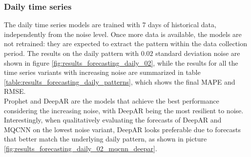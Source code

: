 \documentclass[a4paper, 12pt]{article} %
\begin{document}
	\subsubsection{Daily time series} \label{sssec:results_forecasting_daily}
	The daily time series models are trained with 7 days of historical data, independently from the noise level. Once more data is available, the models are not retrained: they are expected to extract the pattern within the data collection period.  The results on the daily pattern with $0.02$ standard deviation noise are shown in figure \ref{fig:results_forecasting_daily_02}, while the results for all the time series variants with increasing noise are summarized in table \ref{table:results_forecasting_daily_patterns}, which shows the final MAPE and RMSE.\\ 
	Prophet and DeepAR are the models that achieve the best performance considering the increasing noise, with DeepAR being the most resilient to noise. Interestingly, when qualitatively evaluating the forecasts of DeepAR and MQCNN on the lowest noise variant, DeepAR looks preferable due to forecasts that better match the underlying daily pattern, as shown in picture \ref{fig:results_forecasting_daily_02_mqcnn_deepar}. 
	
\end{document}
